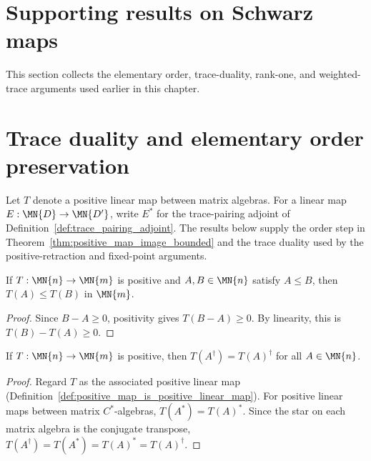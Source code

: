 \section{Supporting results on Schwarz maps}
\label{ch:schwarz_supporting_results}
This section collects the elementary order, trace-duality, rank-one, and
weighted-trace arguments used earlier in this chapter.

\section{Trace duality and elementary order preservation}
\label{sec:app_schwarz_trace_order}

Let $T$ denote a positive linear map between matrix algebras. For a linear map
$E:\MN{D}\to\MN{D'}$, write $E^*$ for the trace-pairing adjoint of
Definition~\ref{def:trace_pairing_adjoint}. The results below supply the
order step in Theorem~\ref{thm:positive_map_image_bounded} and the trace
duality used by the positive-retraction and fixed-point arguments.

\begin{theorem}
    \label{thm:positive_map_monotone}
    \leanok
    If $T:\MN{n}\to\MN{m}$ is positive and
    $A,B\in\MN{n}$ satisfy $A\le B$, then $T(A)\le T(B)$ in $\MN{m}$.
\end{theorem}

\begin{proof}
    \leanok
    Since $B-A\ge0$, positivity gives $T(B-A)\ge0$.
    By linearity, this is $T(B)-T(A)\ge0$.
\end{proof}

\begin{theorem}
    \label{thm:positive_map_conjTranspose}
    \leanok
    If $T:\MN{n}\to\MN{m}$ is positive, then
    $T(A^\dagger)=T(A)^\dagger$ for all $A\in\MN{n}$.
\end{theorem}

\begin{proof}
    \leanok
    Regard $T$ as the associated positive linear map
    (Definition~\ref{def:positive_map_is_positive_linear_map}). For positive
    linear maps between matrix $C^*$-algebras, $T(A^\ast)=T(A)^\ast$.
    Since the star on each matrix algebra is the conjugate transpose,
    $T(A^\dagger)=T(A^\ast)=T(A)^\ast=T(A)^\dagger$.
\end{proof}

